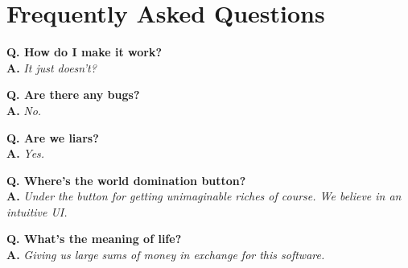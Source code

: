 \section{Frequently Asked Questions}

\newcommand{\faqentry}[2]{\textbf{Q. #1}\\  \textbf{A.} \textit{#2}\vspace{0.5cm}}

\faqentry{How do I make it work?}{It just doesn't?}

\faqentry{Are there any bugs?}{No.}

\faqentry{Are we liars?}{Yes.}

\faqentry{Where's the world domination button?}{Under the button for getting unimaginable riches of course. We believe in an intuitive UI.}

\faqentry{What's the meaning of life?}{Giving us large sums of money in exchange for this software.}